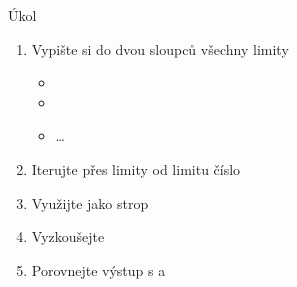 \begin{frame}{Úkol}

  \begin{enumerate}
    \item Vypište si do dvou sloupců všechny limity
    \begin{itemize}
      \item {}
      \item {}
      \item \dots
    \end{itemize}

    \item Iterujte přes limity od limitu číslo 
    \item Využijte  jako strop
    \item Vyzkoušejte
    \item Porovnejte výstup s  a 
  \end{enumerate}

\end{frame}

